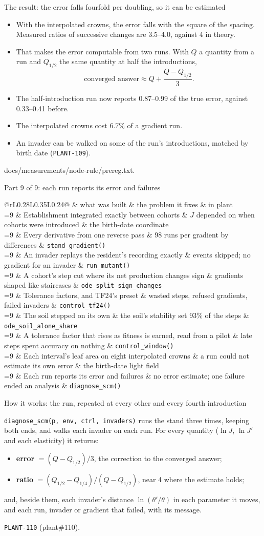 \documentclass[aspectratio=169,10pt]{beamer}
\makeatletter
\newcommand{\src}[1]{\par\vfill{\tiny\color{quiet} #1}}
\newcommand{\rmrow}[4]{%
  \ifnum#1=\rmcurrent \rowcolor{wash}\fi
  #1 & #2 & #3 & #4 \\}
\newcommand{\roadmap}[1]{%
  \def\rmcurrent{#1}%
  \footnotesize
  \begin{tabular}{@{}rL{0.28\textwidth}L{0.35\textwidth}L{0.24\textwidth}@{}}
    \toprule
    & what was built & the problem it fixes & in plant \\
    \midrule
    \rmrow{1}{Establishment integrated exactly between cohorts}{$J$ depended on when cohorts were introduced}{the birth-date coordinate}
    \rmrow{2}{Every derivative from one reverse pass}{98 runs per gradient by differences}{\texttt{stand\_gradient()}}
    \rmrow{3}{An invader replays the resident's recording exactly}{events skipped; no gradient for an invader}{\texttt{run\_mutant()}}
    \rmrow{4}{A cohort's step cut where its net production changes sign}{gradients shaped like staircases}{\texttt{ode\_split\_sign\_changes}}
    \rmrow{5}{Tolerance factors, and TF24's preset}{wasted steps, refused gradients, failed invaders}{\texttt{control\_tf24()}}
    \rmrow{6}{The soil stepped on its own}{the soil's stability set 93\% of the steps}{\texttt{ode\_soil\_alone\_share}}
    \rmrow{7}{A tolerance factor that rises as fitness is earned, read from a pilot}{late steps spent accuracy on nothing}{\texttt{control\_window()}}
    \rmrow{8}{Each interval's leaf area on eight interpolated crowns}{a run could not estimate its own error}{the birth-date light field}
    \rmrow{9}{Each run reports its error and failures}{no error estimate; one failure ended an analysis}{\texttt{diagnose\_scm()}}
    \bottomrule
  \end{tabular}}
\makeatother
\begin{document}
\begin{frame}{The result: the error falls fourfold per doubling, so it can be estimated}
  \small
  \begin{itemize}
    \item With the interpolated crowns, the error falls with the square of the spacing. Measured
      ratios of successive changes are 3.5--4.0, against 4 in theory.
    \item That makes the error computable from two runs. With $Q$ a quantity from a run and
      $Q_{1/2}$ the same quantity at half the introductions,
      \[ \text{converged answer} \approx Q + \frac{Q - Q_{1/2}}{3}. \]
    \item The half-introduction run now reports 0.87--0.99 of the true error, against
      0.33--0.41 before.
    \item The interpolated crowns cost 6.7\% of a gradient run.
    \item An invader can be walked on some of the run's introductions, matched by birth date
      (\texttt{PLANT-109}).
  \end{itemize}
  \src{docs/measurements/node-rule/prereg.txt.}
\end{frame}

\begin{frame}{Part 9 of 9: each run reports its error and failures}
  \roadmap{9}
\end{frame}

\begin{frame}{How it works: the run, repeated at every other and every fourth introduction}
  \begin{center}
  \end{center}
  \small
  \texttt{diagnose\_scm(p, env, ctrl, invaders)} runs the stand three times, keeping both ends,
  and walks each invader on each run. For every quantity ($\ln J$, $\ln J'$ and each
  elasticity) it returns:
  \begin{itemize}
    \item \textbf{error} $= (Q - Q_{1/2})/3$, the correction to the converged answer;
    \item \textbf{ratio} $= (Q_{1/2} - Q_{1/4}) / (Q - Q_{1/2})$, near 4 where the estimate
      holds;
  \end{itemize}
  and, beside them, each invader's distance $\ln(\theta'/\theta)$ in each parameter it moves,
  and each run, invader or gradient that failed, with its message.
  \src{\texttt{PLANT-110} (plant\#110).}
\end{frame}
\end{document}

